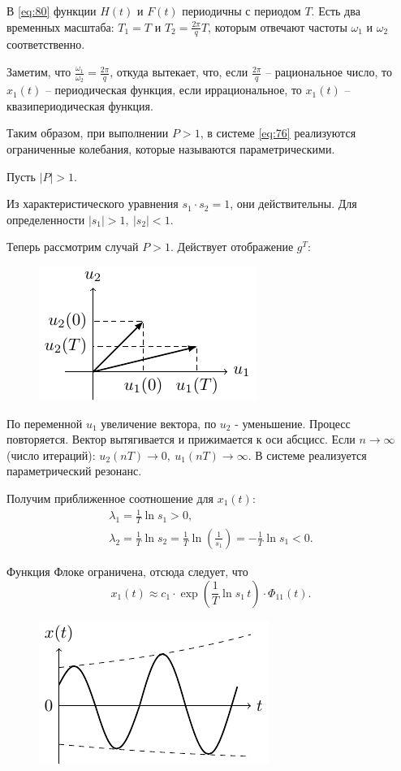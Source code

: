 В \eqref{eq:80} функции  $H(t)$ и $F(t)$ периодичны с периодом $T$. Есть два временных масштаба: $T_1=T$ и $T_2=\frac{2\pi}{q}T$, которым отвечают частоты $\omega_1$ и $\omega_2$ соответственно.

Заметим, что $\frac{\omega_1}{\omega_2}=\frac{2\pi}{q}$, откуда вытекает, что, если $\frac{2\pi}{q}$ -- рациональное число, то $x_1(t)$ -- периодическая функция, если иррациональное, то $x_1(t)$ -- квазипериодическая функция. 

Таким образом, при выполнении $P>1$, в системе \eqref{eq:76} реализуются ограниченные колебания, которые называются параметрическими.

Пусть $|P|>1$.

Из характеристического уравнения $s_1 \cdot s_2=1$, они действительны. Для определенности $|s_1|>1,~ |s_2|<1$.

Теперь рассмотрим случай $P>1$. Действует отображение $g^T$:
\begin{figure}[H]
	\centering
	\includegraphics[scale=1.5]{img/parametric_oscillations/Pbigger}  
\end{figure}

По переменной $u_1$ увеличение вектора, по $u_2$ - уменьшение. Процесс повторяется. Вектор вытягивается и прижимается к оси абсцисс. Если $n\rightarrow \infty$ (число итераций): $u_2(nT)\rightarrow 0,~u_1(nT)\rightarrow \infty$. В системе реализуется параметрический резонанс. 

Получим приближенное соотношение для $x_1(t)$:
\begin{gather*}
	\lambda_1=\frac{1}{T}\ln s_1 >0, \\
	\lambda_2=\frac{1}{T}\ln s_2=\frac{1}{T}\ln(\frac{1}{s_1})=-\frac{1}{T}\ln s_1 <0.
\end{gather*}

Функция Флоке ограничена, отсюда следует, что
\begin{equation*}
	x_1(t)\approx c_1\cdot\exp(\frac{1}{T}\ln s_1 \, t)\cdot\Phi_{11}(t).
\end{equation*}
\begin{figure}[H]
	\centering
	\includegraphics[scale=1.5]{img/parametric_oscillations/x_t}  
\end{figure}

